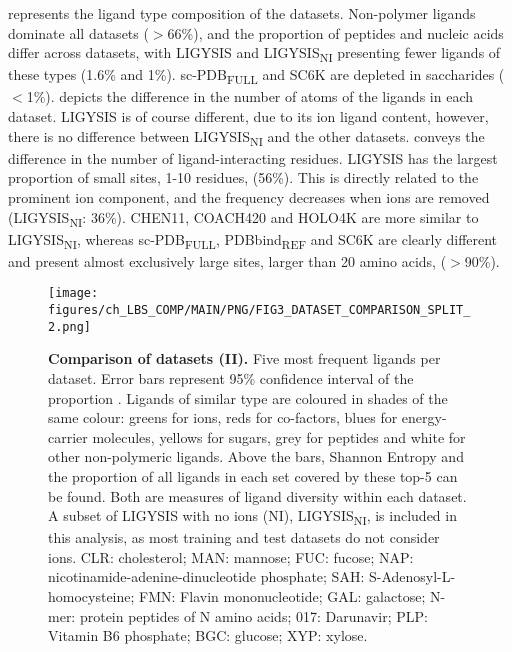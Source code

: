  represents the ligand type composition of the datasets. Non-polymer ligands dominate all datasets ($>$66\%), and the proportion of peptides and nucleic acids differ across datasets, with LIGYSIS and LIGYSIS\textsubscript{NI} presenting fewer ligands of these types (1.6\% and 1\%). sc-PDB\textsubscript{FULL} and SC6K are depleted in saccharides ($<$1\%).  depicts the difference in the number of atoms of the ligands in each dataset. LIGYSIS is of course different, due to its ion ligand content, however, there is no difference between LIGYSIS\textsubscript{NI} and the other datasets.  conveys the difference in the number of ligand-interacting residues. LIGYSIS has the largest proportion of small sites, 1-10 residues, (56\%). This is directly related to the prominent ion component, and the frequency decreases when ions are removed (LIGYSIS\textsubscript{NI}: 36\%). CHEN11, COACH420 and HOLO4K are more similar to LIGYSIS\textsubscript{NI}, whereas sc-PDB\textsubscript{FULL}, PDBbind\textsubscript{REF} and SC6K are clearly different and present almost exclusively large sites, larger than 20 amino acids, ($>$90\%).

\begin{figure}[ht!]
    \centering
    \texttt{[image: figures/ch\_LBS\_COMP/MAIN/PNG/FIG3\_DATASET\_COMPARISON\_SPLIT\_2.png]}
    \caption[Comparison of datasets (II)]{\textbf{Comparison of datasets (II).} Five most frequent ligands per dataset. Error bars represent 95\% confidence interval of the proportion \cite{WILSON_197_PROP_CI}. Ligands of similar type are coloured in shades of the same colour: greens for ions, reds for co-factors, blues for energy-carrier molecules, yellows for sugars, grey for peptides and white for other non-polymeric ligands. Above the bars, Shannon Entropy and the proportion of all ligands in each set covered by these top-5 can be found. Both are measures of ligand diversity within each dataset. A subset of LIGYSIS with no ions (NI), LIGYSIS\textsubscript{NI}, is included in this analysis, as most training and test datasets do not consider ions. CLR: cholesterol; MAN: mannose; FUC: fucose; NAP: nicotinamide-adenine-dinucleotide phosphate; SAH: S-Adenosyl-L-homocysteine; FMN: Flavin mononucleotide; GAL: galactose; N-mer: protein peptides of N amino acids; 017: Darunavir; PLP: Vitamin B6 phosphate; BGC: glucose; XYP: xylose.}
    \label{fig:dataset_comp_2}
\end{figure}


